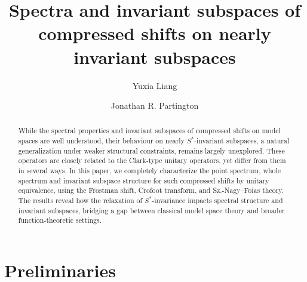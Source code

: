\documentclass[12pt,reqno]{amsart}
\theoremstyle{definition}
\theoremstyle{remark}
\numberwithin{equation}{section}
\begin{document}
\title[Spectra and invariant subspaces]{Spectra and invariant subspaces of compressed shifts on nearly invariant subspaces}
\author[Y. Liang]{Yuxia Liang}
\address{Yuxia Liang \newline School of Mathematical Sciences,
Tianjin Normal University, Tianjin 300387, P.R. China.} 
\author[J. R. Partington]{Jonathan R. Partington}
\address{Jonathan R. Partington \newline School of Mathematics,
  University of Leeds, Leeds LS2 9JT, United Kingdom.}

\begin{abstract} While the spectral properties and invariant subspaces of compressed shifts on model spaces are well understood, their behaviour on nearly $S^*$-invariant subspaces, a natural generalization under weaker structural constraints, remains largely unexplored. These operators are closely related to the Clark-type unitary operators, yet differ from them in several ways. In this paper, we completely characterize the point spectrum, whole spectrum and invariant subspace structure for such compressed shifts by  unitary equivalence, using the Frostman shift, Crofoot transform, and Sz.-Nagy--Foias theory.  The results reveal how the relaxation of $S^*$-invariance impacts spectral structure and invariant subspaces, bridging a gap between classical model space theory and broader function-theoretic settings.
\end{abstract}

\maketitle

\section{Preliminaries}
\end{document}
